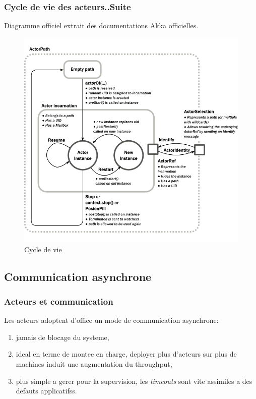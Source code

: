 \documentclass[xcolor=dvipsnames]{beamer}
\begin{document}
\begin{frame}[fragile]
  \frametitle{Cycle de vie des acteurs..Suite}
  Diagramme officiel extrait des documentations Akka officielles.
    \begin{figure}[h!]
  \caption{Cycle de vie}
  \centering
      \includegraphics[scale=0.5]{actor_lifecycle1.png}
  \end{figure}
\end{frame}


\subsection{Communication asynchrone}
\begin{frame}
  \frametitle{Acteurs et communication}
  Les acteurs adoptent d'office un mode de communication asynchrone:
  \begin{enumerate}
  \item jamais de blocage du systeme,
  \item ideal en terme de montee en charge, deployer plus d'acteurs sur plus de machines induit une augmentation du throughput,
  \item plus simple a gerer pour la supervision, les \textit{timeouts} sont vite assimiles a des defauts applicatifss.
  \end{enumerate}
\end{frame}
\end{document}
